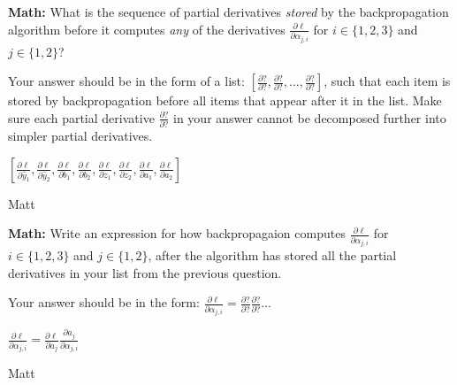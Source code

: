 \begin{parts}
\begin{subparts}
\clearpage
\subpart[3] \textbf{Math:} What is the sequence of partial derivatives \emph{stored} by the backpropagation algorithm before it computes \textit{any} of the derivatives $\frac{\partial \ell}{\partial\alpha_{j,i}}$ for $i \in \{1, 2, 3\}$ and $j \in \{1, 2\}$?

    Your answer should be in the form of a list: 
    $[\frac{\partial ?}{\partial ?}, \frac{\partial ?}{\partial ?}, \dots , \frac{\partial ?}{\partial ?}]$, such that each item is stored by backpropagation before all items that appear after it in the list.
    Make sure each partial derivative $\frac{\partial ?}{\partial ?}$ in your answer cannot be decomposed further into simpler partial derivatives. 
    
    \begin{tcolorbox}[fit,height=3cm, width=15cm, blank, borderline={1pt}{-2pt},nobeforeafter]
    \begin{soln}
        $[
        \frac{\partial \ell}{\partial \hat{y}_1}, 
        \frac{\partial \ell}{\partial \hat{y}_2}, 
        \frac{\partial \ell}{\partial b_1},
        \frac{\partial \ell}{\partial b_2},
        \frac{\partial \ell}{\partial z_1}, 
        \frac{\partial \ell}{\partial z_2},
        \frac{\partial \ell}{\partial a_1}, 
        \frac{\partial \ell}{\partial a_2}
        ]
        $
    \end{soln}
    \end{tcolorbox}
    \begin{qauthor}   Matt    \end{qauthor}
    
\subpart[2] \textbf{Math:} Write an expression for how backpropagaion computes $\frac{\partial \ell}{\partial\alpha_{j,i}}$ for $i \in \{1, 2, 3\}$ and $j \in \{1, 2\}$, after the algorithm has stored all the partial derivatives in your list from the previous question.

    Your answer should be in the form: 
    $\frac{\partial \ell}{\partial \alpha_{j,i}} = \frac{\partial ?}{\partial ?} \frac{\partial ?}{\partial ?} \dots$
    
    \begin{tcolorbox}[fit,height=3cm, width=15cm, blank, borderline={1pt}{-2pt},nobeforeafter]
    \begin{soln}
        $\frac{\partial \ell}{\partial\alpha_{j,i}} =
        \frac{\partial \ell}{\partial a_j}
        \frac{\partial a_j}{\partial \alpha_{j,i}}
        $
    \end{soln}
    \end{tcolorbox}
    \begin{qauthor}   Matt    \end{qauthor}


\end{subparts}
\end{parts}
